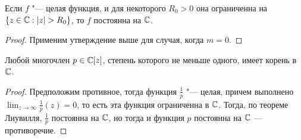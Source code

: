 \begin{corollary}
	Если $f$ "--- целая функция, и для некоторого $R_0 > 0$ она ограниченна на $\{z \in \mathbb{C}: |z| > R_0\}$, то $f$ постоянна на $\mathbb{C}$.
\end{corollary}

\begin{proof}
	Применим утверждение выше для случая, когда $m = 0$.
\end{proof}

\begin{theorem}
	Любой многочлен $p \in \mathbb{C}[z]$, степень которого не меньше одного, имеет корень в $\mathbb{C}$.
\end{theorem}

\begin{proof}
	Предположим противное, тогда функция $\frac 1p$ "--- целая, причем выполнено $\lim_{z \to \infty} \frac1p(z) = 0$, то есть эта функция ограниченна в $\mathbb{C}$. Тогда, по теореме Лиувилля, $\frac 1p$ постоянна на $\mathbb{C}$, но тогда и функция $p$ постоянна на $\mathbb{C}$ --- противоречие.
\end{proof}